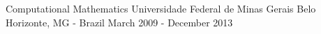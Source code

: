 

\begin{cventries}

    \cventry
    {Computational Mathematics} %
    {Universidade Federal de Minas Gerais} %
    {Belo Horizonte, MG - Brazil} %
    {March 2009 - December 2013} %
    {
      \begin{cvitems} %
      \end{cvitems}
    }

\end{cventries}
